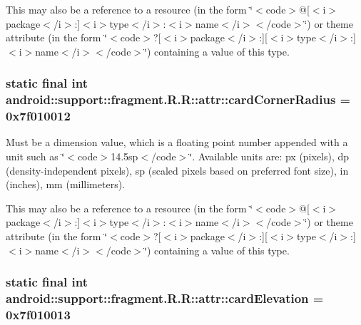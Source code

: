 This may also be a reference to a resource (in the form \char`\"{}$<$code$>$@\mbox{[}$<$i$>$package$<$/i$>$:\mbox{]}$<$i$>$type$<$/i$>$:$<$i$>$name$<$/i$>$$<$/code$>$\char`\"{}) or theme attribute (in the form \char`\"{}$<$code$>$?\mbox{[}$<$i$>$package$<$/i$>$:\mbox{]}\mbox{[}$<$i$>$type$<$/i$>$:\mbox{]}$<$i$>$name$<$/i$>$$<$/code$>$\char`\"{}) containing a value of this type. \hypertarget{classandroid_1_1support_1_1fragment_1_1_r_1_1attr_7571555141017a9696acb9206d704e5a}{
\subsubsection[{cardCornerRadius}]{\setlength{\rightskip}{0pt plus 5cm}static final int android::support::fragment.R.R::attr::cardCornerRadius = 0x7f010012}}
\label{classandroid_1_1support_1_1fragment_1_1_r_1_1attr_7571555141017a9696acb9206d704e5a}


Must be a dimension value, which is a floating point number appended with a unit such as \char`\"{}$<$code$>$14.5sp$<$/code$>$\char`\"{}. Available units are: px (pixels), dp (density-independent pixels), sp (scaled pixels based on preferred font size), in (inches), mm (millimeters). 

This may also be a reference to a resource (in the form \char`\"{}$<$code$>$@\mbox{[}$<$i$>$package$<$/i$>$:\mbox{]}$<$i$>$type$<$/i$>$:$<$i$>$name$<$/i$>$$<$/code$>$\char`\"{}) or theme attribute (in the form \char`\"{}$<$code$>$?\mbox{[}$<$i$>$package$<$/i$>$:\mbox{]}\mbox{[}$<$i$>$type$<$/i$>$:\mbox{]}$<$i$>$name$<$/i$>$$<$/code$>$\char`\"{}) containing a value of this type. \hypertarget{classandroid_1_1support_1_1fragment_1_1_r_1_1attr_0ec3df6871a78f1661453e8acb73e2a1}{
\subsubsection[{cardElevation}]{\setlength{\rightskip}{0pt plus 5cm}static final int android::support::fragment.R.R::attr::cardElevation = 0x7f010013}}
\label{classandroid_1_1support_1_1fragment_1_1_r_1_1attr_0ec3df6871a78f1661453e8acb73e2a1}


